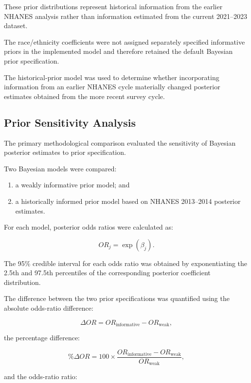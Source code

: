 \documentclass[12pt]{article}
\begin{document}
These prior distributions represent historical information from the earlier NHANES analysis rather than information estimated from the current 2021--2023 dataset.

The race/ethnicity coefficients were not assigned separately specified informative priors in the implemented model and therefore retained the default Bayesian prior specification.

The historical-prior model was used to determine whether incorporating information from an earlier NHANES cycle materially changed posterior estimates obtained from the more recent survey cycle.


\subsection{Prior Sensitivity Analysis}

The primary methodological comparison evaluated the sensitivity of Bayesian posterior estimates to prior specification.

Two Bayesian models were compared:

\begin{enumerate}
    \item a weakly informative prior model; and
    \item a historically informed prior model based on NHANES 2013--2014 posterior estimates.
\end{enumerate}

For each model, posterior odds ratios were calculated as:

\[
OR_j = \exp(\beta_j).
\]

The 95\% credible interval for each odds ratio was obtained by exponentiating the 2.5th and 97.5th percentiles of the corresponding posterior coefficient distribution.

The difference between the two prior specifications was quantified using the absolute odds-ratio difference:

\[
\Delta OR =
OR_{\text{informative}}
-
OR_{\text{weak}},
\]

the percentage difference:

\[
\%\Delta OR =
100
\times
\frac{
OR_{\text{informative}}
-
OR_{\text{weak}}
}{
OR_{\text{weak}}
},
\]

and the odds-ratio ratio:
\end{document}
